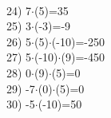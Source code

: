 \documentclass[a4paper,10pt]{article}
\begin{document}
\vspace{0.5cm}\\24)   7$\cdot$(5)=35
\vspace{0.5cm}\\25)   3$\cdot$(-3)=-9
\vspace{0.5cm}\\26)   5$\cdot$(5)$\cdot$(-10)=-250
\vspace{0.5cm}\\27)   5$\cdot$(-10)$\cdot$(9)=-450
\vspace{0.5cm}\\28)   0$\cdot$(9)$\cdot$(5)=0
\vspace{0.5cm}\\29)   -7$\cdot$(0)$\cdot$(5)=0
\vspace{0.5cm}\\30)   -5$\cdot$(-10)=50
\vspace{0.5cm}\\\pagebreak
\end{document}
